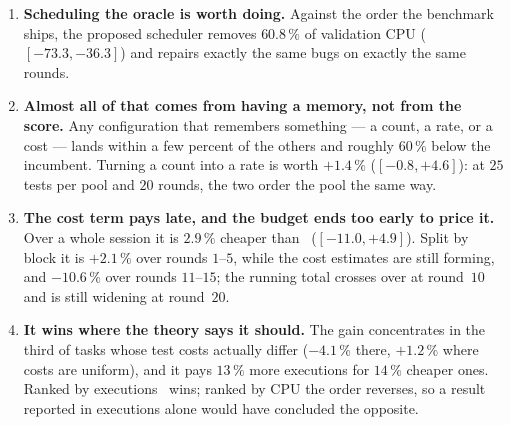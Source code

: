 \begin{enumerate}[leftmargin=*,itemsep=4pt]

\item \textbf{Scheduling the oracle is worth doing.} Against the order the
benchmark ships, the proposed scheduler removes $60.8\,\%$ of validation CPU
($[-73.3, -36.3]$) and repairs exactly the same bugs on exactly the same
rounds.

\item \textbf{Almost all of that comes from having a memory, not from the
score.} Any configuration that remembers something --- a count, a rate, or a
cost --- lands within a few percent of the others and roughly $60\,\%$ below
the incumbent. Turning a count into a rate is worth $+1.4\,\%$
($[-0.8, +4.6]$): at $25$ tests per pool and $20$ rounds, the two order the
pool the same way.

\item \textbf{The cost term pays late, and the budget ends too early to price
it.} Over a whole session it is $2.9\,\%$ cheaper than \frtp\
($[-11.0, +4.9]$). Split by block it is $+2.1\,\%$ over rounds $1$--$5$, while
the cost estimates are still forming, and $-10.6\,\%$ over rounds $11$--$15$;
the running total crosses over at round~$10$ and is still widening at
round~$20$.

\item \textbf{It wins where the theory says it should.} The gain concentrates
in the third of tasks whose test costs actually differ ($-4.1\,\%$ there,
$+1.2\,\%$ where costs are uniform), and it pays $13\,\%$ more executions for
$14\,\%$ cheaper ones. Ranked by executions \frtp\ wins; ranked by CPU the
order reverses, so a result reported in executions alone would have concluded
the opposite.

\end{enumerate}
